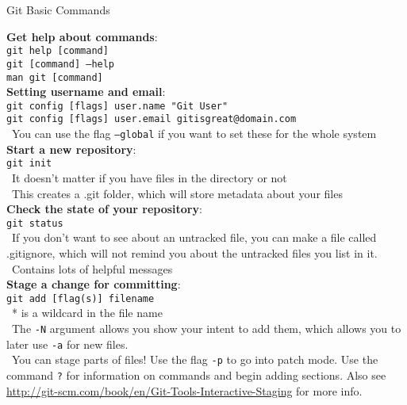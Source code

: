 \documentclass[12pt]{article}
\begin{document}
\begin{center}
{\large Git Basic Commands}
\end{center}
{\setlength{\parindent}{0cm}    
{\bf Get help about commands}:\\
\texttt{git help [command]}\\
\texttt{git [command] --help}\\
\texttt{man git [command]}\\

{\bf Setting username and email}:\\
\texttt{git config [flags] user.name "Git User"}\\
\texttt{git config [flags] user.email gitisgreat@domain.com}\\
\textbullet\, You can use the flag \texttt{--global} if you want to set these for the whole system\\

{\bf Start a new repository}:\\
\texttt{git init}\\
\textbullet\, It doesn't matter if you have files in the directory or not\\
\textbullet\, This creates a .git folder, which will store metadata about your files\\

{\bf Check the state of your repository}:\\
\texttt{git status}\\
\textbullet\, If you don't want to see about an untracked file, you can make a file called .gitignore, which will not remind you about the untracked files you list in it.\\
\textbullet\, Contains lots of helpful messages\\

{\bf Stage a change for committing}:\\
\texttt{git add [flag(s)] filename}\\
\textbullet\, * is a wildcard in the file name\\
\textbullet\, The \texttt{-N} argument allows you show your intent to add them, which allows you to later use \texttt{-a} for new files.\\
\textbullet\, You can stage parts of files! Use the flag \texttt{-p} to go into patch mode. Use the command \texttt{?} for information on commands and begin adding sections. Also see\\ \url{http://git-scm.com/book/en/Git-Tools-Interactive-Staging} for more info.\\

}
\end{document}
